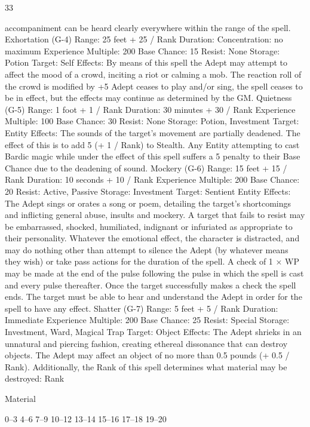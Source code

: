 \documentclass[a4paper]{article}
\begin{document}
\begin{multicols}{3}
33

accompaniment can be heard clearly everywhere
within the range of the spell.
Exhortation (G-4)
Range: 25 feet + 25 / Rank
Duration: Concentration: no maximum
Experience Multiple: 200
Base Chance: 15%
Resist: None
Storage: Potion
Target: Self
Effects: By means of this spell the Adept may
attempt to affect the mood of a crowd, inciting a
riot or calming a mob. The reaction roll of the
crowd is modified by +5%
Adept ceases to play and/or sing, the spell ceases to
be in effect, but the effects may continue as determined by the GM.
Quietness (G-5)
Range: 1 foot + 1 / Rank
Duration: 30 minutes + 30 / Rank
Experience Multiple: 100
Base Chance: 30%
Resist: None
Storage: Potion, Investment
Target: Entity
Effects: The sounds of the target’s movement are
partially deadened. The effect of this is to add 5%
(+ 1 / Rank) to Stealth. Any Entity attempting to
cast Bardic magic while under the effect of this
spell suffers a 5 penalty to their Base Chance due
to the deadening of sound.
Mockery (G-6)
Range: 15 feet + 15 / Rank
Duration: 10 seconds + 10 / Rank
Experience Multiple: 200
Base Chance: 20%
Resist: Active, Passive
Storage: Investment
Target: Sentient Entity
Effects: The Adept sings or orates a song or poem,
detailing the target’s shortcomings and inflicting
general abuse, insults and mockery. A target that
fails to resist may be embarrassed, shocked, humiliated, indignant or infuriated as appropriate to
their personality. Whatever the emotional effect,
the character is distracted, and may do nothing
other than attempt to silence the Adept (by whatever means they wish) or take pass actions for the
duration of the spell. A check of 1 × WP may be
made at the end of the pulse following the pulse in
which the spell is cast and every pulse thereafter.
Once the target successfully makes a check the
spell ends. The target must be able to hear and
understand the Adept in order for the spell to have
any effect.
Shatter (G-7)
Range: 5 feet + 5 / Rank
Duration: Immediate
Experience Multiple: 200
Base Chance: 25%
Resist: Special
Storage: Investment, Ward, Magical Trap
Target: Object
Effects: The Adept shrieks in an unnatural and
piercing fashion, creating ethereal dissonance that
can destroy objects. The Adept may affect an object of no more than 0.5 pounds (+ 0.5 / Rank).
Additionally, the Rank of this spell determines
what material may be destroyed:
Rank

Material

0–3
4–6
7–9
10–12
13–14
15–16
17–18
19–20


\end{multicols}
\end{document}
